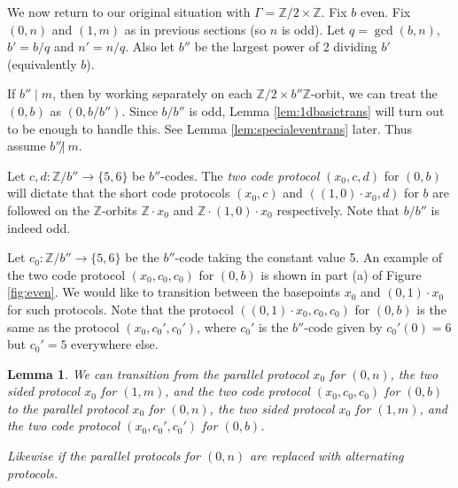 \documentclass[12pt]{article}
\newcommand{\0}{\varnothing}
\newcommand{\Z}{\mathbb{Z}}
\newtheorem{lemma}{Lemma}
\begin{document}
We now return to our original situation with $\Gamma = \Z/2 \times \Z$. Fix $b$ even. Fix $(0,n)$ and $(1,m)$ as in previous sections (so $n$ is odd). Let $q = \gcd(b,n)$, $b' = b/q$ and $n' = n/q$. Also let $b''$ be the largest power of 2 dividing $b'$ (equivalently $b$).

If $b'' \mid m$, then by working separately on each $\Z/2 \times b''\Z$-orbit, we can treat the $(0,b)$ as $(0,b/b'')$. Since $b/b''$ is odd, Lemma \ref{lem:1dbasictrans} will turn out to be enough to handle this. See Lemma \ref{lem:specialeventrans} later. Thus assume $b'' \not|\ m$.




Let $c,d :\Z/b'' \rightarrow \{5,6\}$ be $b''$-codes. The \textit{two code protocol} $(x_0,c,d)$ for $(0,b)$ will dictate that the short code protocols $(x_0,c)$ and $((1,0) \cdot x_0, d)$ for $b$ are followed on the $\Z$-orbits $\Z \cdot x_0$ and $\Z \cdot (1,0) \cdot x_0$ respectively. Note that $b/b''$ is indeed odd.

Let $c_0:\Z/b'' \rightarrow \{5,6\}$ be the $b''$-code taking the constant value 5. An example of the two code protocol $(x_0,c_0,c_0)$ for $(0,b)$ is shown in part (a) of Figure \ref{fig:even}. We would like to transition between the basepoints $x_0$ and $(0,1) \cdot x_0$ for such protocols. Note that the protocol $((0,1) \cdot x_0,c_0,c_0)$ for $(0,b)$ is the same as the protocol $(x_0,c_0',c_0')$, where $c_0'$ is the $b''$-code given by $c_0'(0) = 6$ but $c_0' = 5$ everywhere else.

\begin{lemma}\label{lem:eventrans}
We can transition from the parallel protocol $x_0$ for $(0,n)$, the two sided protocol $x_0$ for $(1,m)$, and the two code protocol $(x_0,c_0,c_0)$ for $(0,b)$ to the parallel protocol $x_0$ for $(0,n)$, the two sided protocol $x_0$ for $(1,m)$, and the two code protocol $(x_0,c_0',c_0')$ for $(0,b)$.

Likewise if the parallel protocols for $(0,n)$ are replaced with alternating protocols.
\end{lemma}
\end{document}

